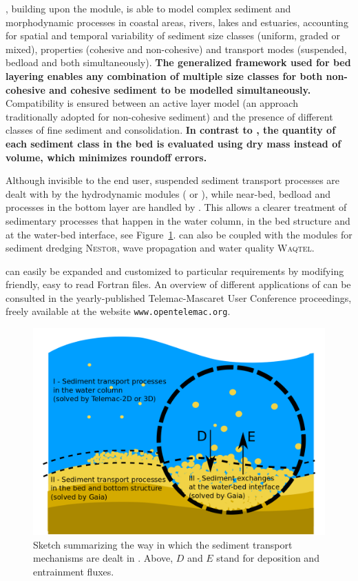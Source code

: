 \gaia{}, building upon the \sisyphe{} module, is able to model complex sediment and morphodynamic processes in coastal areas, rivers, lakes and estuaries, accounting for spatial and temporal variability of sediment size classes (uniform, graded or mixed), properties (cohesive and non-cohesive) and transport modes (suspended, bedload and both simultaneously). \textbf{The generalized framework used for bed layering enables any combination of multiple size classes for both non-cohesive and cohesive sediment to be modelled simultaneously.} Compatibility is ensured between an active layer model (an approach traditionally adopted for non-cohesive sediment) and the presence of different classes of fine sediment and consolidation. \textbf{In contrast to \sisyphe{}, the quantity of each sediment class in the bed is evaluated using dry mass instead of volume, which minimizes roundoff errors.}

Although invisible to the end user, suspended sediment transport processes are dealt with by the hydrodynamic modules ( or ), while near-bed, bedload and processes in the bottom layer are handled by \gaia{}. This allows a clearer treatment of sedimentary processes that happen in the water column, in the bed structure and at the water-bed interface, see Figure~\ref{fig:sketch}. \gaia{} can also be coupled with the modules for sediment dredging \textsc{Nestor}, wave propagation \tomawac{} and water quality \textsc{Waqtel}.

\gaia{} can easily be expanded and customized to particular requirements by modifying friendly,
easy to read Fortran files. An overview of different applications of \gaia{} can be consulted in the yearly-published Telemac-Mascaret User Conference proceedings, freely available at the website \texttt{www.opentelemac.org}.

\begin{figure}
\centering
\includegraphics[trim=0 0 0 0, clip,scale=0.22]{./graphics/sediment_transport_processes}
\caption{Sketch summarizing the way in which the sediment transport mechanisms are dealt in \gaia{}. Above, $D$ and $E$ stand for deposition and entrainment fluxes.}
\label{fig:sketch}
\end{figure}


